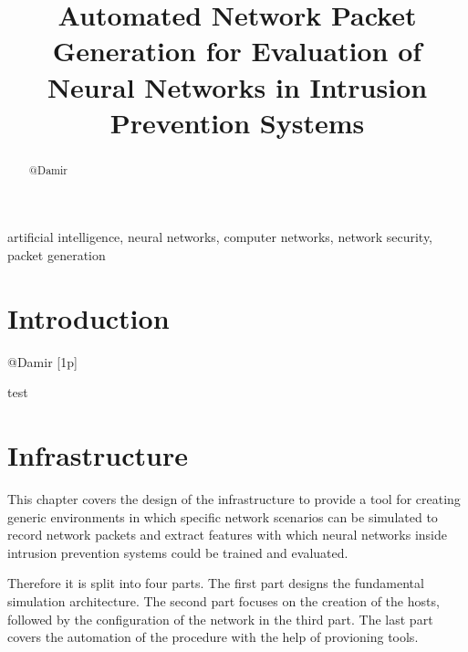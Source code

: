 \documentclass[conference]{IEEEtran}
\begin{document}
\title{Automated Network Packet Generation for Evaluation of Neural Networks in Intrusion Prevention Systems}

\author{
\and
{}
\and
{}
}

\maketitle

\begin{abstract}
@Damir
\end{abstract}

\begin{IEEEkeywords}
artificial intelligence, neural networks, computer networks, network security, packet generation
\end{IEEEkeywords}

\section{Introduction}
@Damir [1p]

\newpage
test
\newpage

\section{Infrastructure}

This chapter covers the design of the infrastructure to provide a tool for creating generic environments in which specific network scenarios can be simulated to record network packets and extract features with which neural networks inside intrusion prevention systems could be trained and evaluated.

Therefore it is split into four parts. The first part designs the fundamental simulation architecture. The second part focuses on the creation of the hosts, followed by the configuration of the network in the third part. The last part covers the automation of the procedure with the help of provioning tools.
\end{document}
